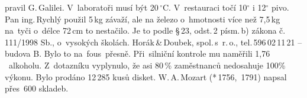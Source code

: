 \documentclass[a4paper]{article}
\begin{document}
 pravil G.\,Galilei. V~laboratoři musí být 20\,$^\circ$C. V~restauraci  točí 10$^\circ$ i 12$^\circ$ pivo. Pan ing.\,Rychlý použil 5\,kg závaží, ale na železo o~hmotnosti více než 7,5\,kg na~tyči o~délce 72\,cm to nestačilo. Je to podle \S\,23, odst.\,2 písm.\,b) zákona č.\,111/1998 Sb., o~vysokých školách. Horák\,\&\,Doubek, spol.\,s~r.\,o., tel.\,596\,02\,11\,21 -- budova B. Bylo to \frqq na~fous\flqq\ přesně. Při~silniční kontrole mu naměřili 1,76\,\textperthousand\ alkoholu. Z~dotazníku vyplynulo, že asi 80\,\% zaměstnanců nedosahuje 100\% výkonu. Bylo prodáno 12\,285 kusů disket. W.\,A.\,Mozart (*\,1756, \dag\,1791) napsal přes~600 skladeb.
\end{document}
